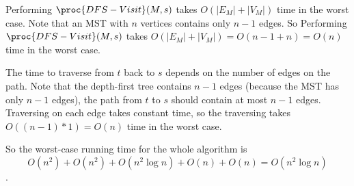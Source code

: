 \documentclass[11pt, answers]{exam}
\theoremstyle{plain}
\theoremstyle{definition}
\begin{document}
\begin{questions}
\begin{solution}
\begin{parts}
Performing $\proc{DFS-Visit}(M,s)$ takes $O(|E_M|+|V_M|)$ time in the worst case. Note that an MST with $n$ vertices contains only $n-1$ edges. So Performing $\proc{DFS-Visit}(M,s)$ takes $O(|E_M|+|V_M|) = O(n-1+n) = O(n)$ time in the worst case.

The time to traverse from $t$ back to $s$ depends on the number of edges on the path. Note that the depth-first tree contains $n-1$ edges (because the MST has only $n-1$ edges), the path from $t$ to $s$ should contain at most $n-1$ edges. Traversing on each edge takes constant time, so the traversing takes $O((n-1)*1)= O(n)$ time in the worst case.

So the worst-case running time for the whole algorithm is 
$$O(n^2) + O(n^2) + O(n^2 \log{n}) + O(n) + O(n) =  O(n^2 \log{n})$$.

\end{parts}
\end{solution}

\end{questions}
\end{document}
